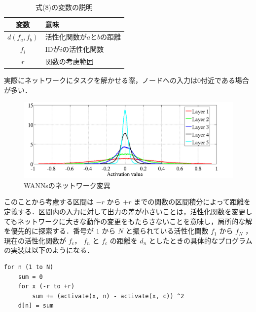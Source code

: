 \begin{table}[h]
    \caption{式(8)の変数の説明}
    \centering
    \begin{tabular}{cl}
        \hline
        変数  & 意味 \\
        \hline \hline
        $d(f_{a}, f_{b})$ & 活性化関数が$a$と$b$の距離                 \\
        $f_{i}$           & IDが$i$の活性化関数                        \\
        $r$               & 関数の考慮範囲                             \\
        \hline
    \end{tabular}
\end{table}

実際にネットワークにタスクを解かせる際，ノードへの入力は0付近である場合が多い\cite{ノード入力}．

\begin{figure}[h]
    \begin{center}
        \includegraphics[width=120mm]{img/expinput.png}
        \caption{WANNsのネットワーク変異}
    \end{center}
\end{figure}

このことから考慮する区間は $ -r $ から $ +r $ までの関数の区間積分によって距離を定義する．区間内の入力に対して出力の差が小さいことは，活性化関数を変更してもネットワークに大きな動作の変更をもたらさないことを意味し，局所的な解を優先的に探索する．番号が $ 1 $ から $ N $ と振られている活性化関数 $ f_1 $ から $ f_N $ ，現在の活性化関数が $ f_c $， $ f_n $ と $ f_c $ の距離を $ d_n $ としたときの具体的なプログラムの実装は以下のようになる．

\begin{lstlisting}[caption=区間積分差のプログラム]
for n (1 to N)
    sum = 0
    for x (-r to +r)
        sum += (activate(x, n) - activate(x, c)) ^2
    d[n] = sum
\end{lstlisting}

